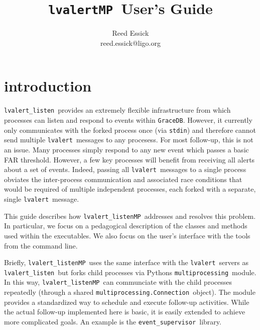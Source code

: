 \documentclass{article}
\newcommand{\stdin}{\texttt{stdin}}
\newcommand{\multiprocessing}{\texttt{multiprocessing}}
\newcommand{\multiprocessingConnection}{\texttt{multiprocessing.Connection}}
\newcommand{\GraceDB}{\texttt{GraceDB}}
\newcommand{\alert}{\texttt{lvalert}}
\newcommand{\lvalertListen}{\texttt{lvalert\_listen}}
\newcommand{\lvalertMP}{\texttt{lvalertMP}}
\newcommand{\lvalertListenMP}{\texttt{lvalert\_listenMP}}
\newcommand{\eventSupervisor}{\texttt{event\_supervisor}}
\begin{document}

\title{
\lvalertMP~User's Guide
}

\author{
Reed Essick \\
reed.essick@ligo.org
}

\maketitle

\newpage


\tableofcontents
\listoffigures

\newpage


\section{introduction}

\lvalertListen~provides an extremely flexible infrastructure from which processes can listen and respond to events within \GraceDB. 
However, it currently only communicates with the forked process once (via \stdin) and therefore cannot send multiple \alert~messages to any procesess.
For most follow-up, this is not an issue.
Many processes simply respond to any new event which passes a basic FAR threshold. 
However, a few key processes will benefit from receiving all alerts about a set of events.
Indeed, passing all \alert~messages to a single process obviates the inter-process communication and associated race conditions that would be required of multiple independent processes, each forked with a separate, single \alert~message.

This guide describes how \lvalertListenMP~addresses and resolves this problem. 
In particular, we focus on a pedagogical description of the classes and methods used within the executables.
We also focus on the user's interface with the tools from the command line.

Briefly, \lvalertListenMP~uses the same interface with the \alert~servers as \lvalertListen~but forks child processes via Pythons \multiprocessing~module.
In this way, \lvalertListenMP~can communciate with the child processes repeatedly (through a shared \multiprocessingConnection~object).
The module provides a standardized way to schedule and execute follow-up activities.
While the actual follow-up implemented here is basic, it is easily extended to achieve more complicated goals.
An example is the \eventSupervisor~library.
\end{document}
